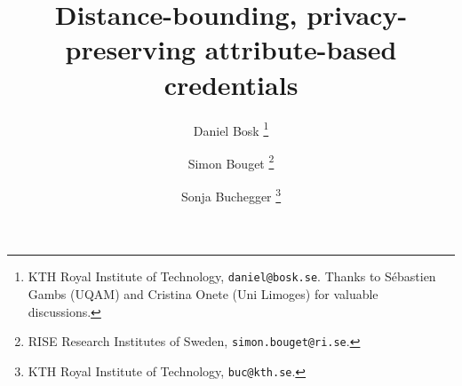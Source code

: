 \documentclass[USenglish]{article}
\begin{document}
\author{%
  Daniel Bosk%
  \thanks{%
    KTH Royal Institute of Technology, \texttt{daniel@bosk.se}.
    Thanks to Sébastien Gambs (UQAM) and Cristina Onete (Uni Limoges) for 
    valuable discussions.
  }
  \and Simon Bouget%
  \thanks{RISE Research Institutes of Sweden, \texttt{simon.bouget@ri.se}.}
  \and Sonja Buchegger%
  \thanks{KTH Royal Institute of Technology, \texttt{buc@kth.se}.}
}

\title{%
  Distance-bounding, privacy-preserving attribute-based credentials
}


\end{document}
